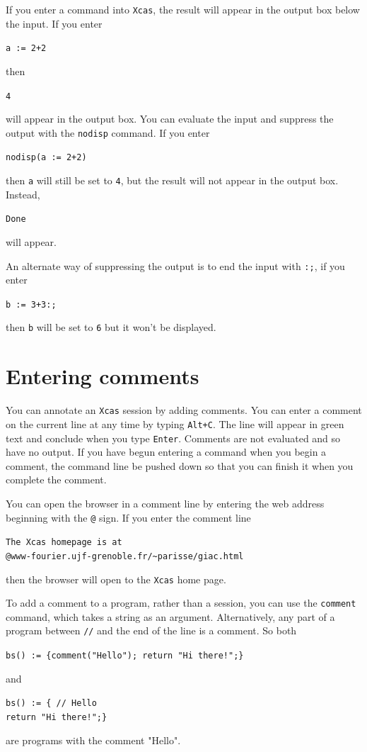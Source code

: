 \documentclass[a4paper,11pt]{book}
\begin{document}
If you enter a command into \texttt{Xcas}, the result will appear in
the output box below the input.  If you enter
\begin{center}
  {\tt a := 2+2}
\end{center}
then 
\begin{center}
  {\tt 4}
\end{center}
will appear in the output box.  You can evaluate the input and
suppress the output with the \texttt{nodisp} command.
If you enter 
\begin{center}
  {\tt nodisp(a := 2+2)}
\end{center}
then \texttt{a} will still be set to \texttt{4}, but the result will
not appear in the output box.  Instead, 
\begin{center}
  {\tt Done}
\end{center}
will appear.

An alternate way of suppressing the output is to end the input with
\texttt{:;}\index{:;}, if you enter
\begin{center}
  {\tt b := 3+3:;}
\end{center}
then \texttt{b} will be set to \texttt{6} but it won't be displayed.

\section{Entering comments}

You can annotate an \texttt{Xcas} session by adding comments.
You can enter a comment on the current line at any time by typing
\texttt{Alt+C}.  The line will appear in green text and conclude when
you type \texttt{Enter}.  Comments are not evaluated and so have no
output.  If you have begun entering a command when you begin a
comment, the command line be pushed down so that you can finish it
when you complete the comment.

You can open the browser in a comment line by entering the web address
beginning with the \texttt{@} sign.  If you enter the comment line
\begin{center}
{\tt The Xcas homepage is at\\
@www-fourier.ujf-grenoble.fr/\~{}parisse/giac.html}
\end{center}
then the browser will open to the \texttt{Xcas} home page.

To add a comment to a program, rather than a session, you can use the
\texttt{comment} command, which takes a string as an argument.
Alternatively, any part of a program between \texttt{//}\index{//} and the end
of the line is a comment.  So both
\begin{center}
{\tt bs() := \{comment("Hello"); return "Hi there!";\}}
\end{center}
and
\begin{center}
{\tt bs() := \{ // Hello\\
       return "Hi there!";\}}
\end{center}
are programs with the comment "Hello".
\end{document}
